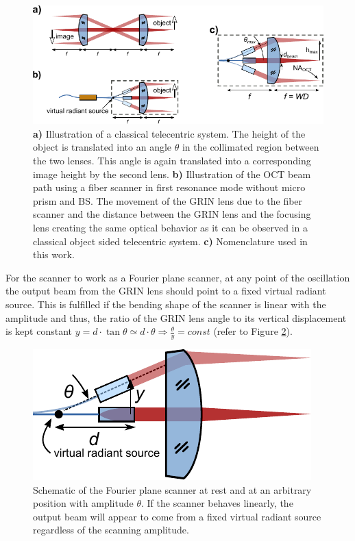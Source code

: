 \begin{figure}[h!]\centering \includegraphics[width=\columnwidth]{figures/30_DesignSimulation/fps.pdf}
      \caption{\textbf{a)} Illustration of a classical telecentric system. The height of the object is translated into an angle $\theta$ in the collimated region between the two lenses. This angle is again translated into a corresponding image height by the second lens. \textbf{b)} Illustration of the OCT beam path using a fiber scanner in first resonance mode without micro prism and BS. The movement of the GRIN lens due to the fiber scanner and the distance between the GRIN lens and the focusing lens creating the same optical behavior as it can be observed in a classical object sided telecentric system. \textbf{c)} Nomenclature used in this work.}
      \label{fig:fps}
\end{figure}

For the scanner to work as a Fourier plane scanner, at any point of the oscillation the output beam from the GRIN lens should point to a fixed virtual radiant source. This is fulfilled if the bending shape of the scanner is linear with the amplitude and thus, the ratio of the GRIN lens angle to its vertical displacement is kept constant $ y = d \cdot \tan \theta \simeq d \cdot \theta \Rightarrow \frac{\theta}{y} = const $ (refer to Figure \ref{fig:radiant}).

\begin{figure}[h!]\centering
      \includegraphics{figures/30_DesignSimulation/Mechanical/radiant.pdf}
      \caption{Schematic of the Fourier plane scanner at rest and at an arbitrary position with amplitude $\theta$. If the scanner behaves linearly, the output beam will appear to come from a fixed virtual radiant source regardless of the scanning amplitude.}
      \label{fig:radiant}
\end{figure}

